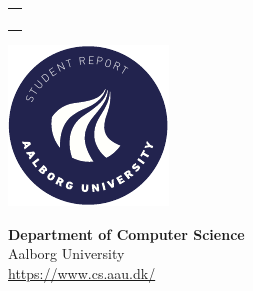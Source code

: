 \begin{titlepage}
{{\begin{tabular}{@{}p{\textwidth}@{}}
				\begin{center}
					{\Large{\theauthor}}\\
					\vspace{0.2cm}
					{\large{\thetheme\\\thegroup\\\thedate}
					}
				\end{center}
				\vspace{0.2cm}
				\begin{center}
					{\Large{\theprojecttype}}
				\end{center}
			\end{tabular}}}
	\vfill
	\begin{center}
		\includegraphics[width=0.2\paperwidth]{aau/aau_logo_circle_en}
	\end{center}
\end{titlepage}
\clearpage

{\textbf{Department of Computer Science}\\
	Aalborg University\\
	\href{https://www.cs.aau.dk/}{https://www.cs.aau.dk/}}
{\theabstract}
